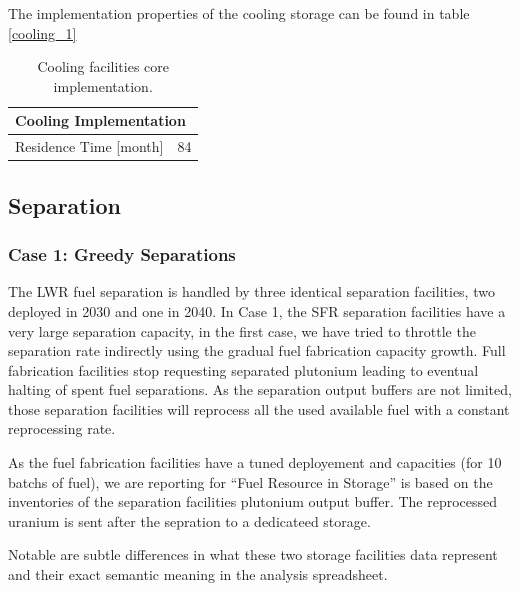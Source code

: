 \documentclass[12pt]{article}
\begin{document}
The implementation properties of the cooling storage can be found in table \ref{cooling_1} 
\begin{table}[h!]
    \centering
    \begin{tabular}{ll}
    \hline
    \multicolumn{2}{l}{Cooling Implementation}  \\
    \hline
    Residence Time [month]   &  84  \\
    \hline
    \end{tabular}
    \caption{Cooling facilities core implementation.}
    \label{tab:cooling_1}
\end{table}

\subsection{Separation}

\subsubsection{Case 1: Greedy Separations}

The LWR fuel separation is handled by three identical separation facilities,
two deployed in 2030 and one in 2040. In Case 1, the SFR separation facilities have a
very large separation capacity, in the first case, we have tried to throttle
the separation rate indirectly using the gradual fuel fabrication capacity
growth. Full fabrication facilities stop requesting separated plutonium
leading to eventual halting of spent fuel separations.
As the separation output buffers are not limited, those separation facilities will
reprocess all the used available fuel with a constant reprocessing rate.

As the fuel fabrication facilities have a tuned deployement and capacities (for 10
batchs of fuel), we are reporting for ``Fuel Resource in Storage'' is based on the
inventories of the separation facilities plutonium output buffer.
The reprocessed uranium is sent after the sepration to a dedicateed storage.

Notable are subtle differences in what these two storage facilities data represent
and their exact semantic meaning in the analysis spreadsheet.
\end{document}
